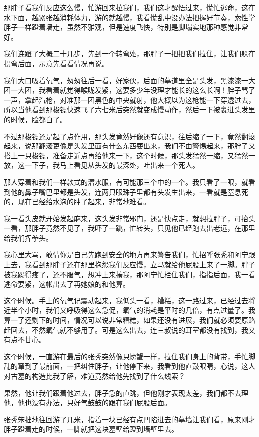 那胖子看我们反应这么慢，忙游回来拉我们，我们这才醒悟过来，慌忙逃命，这在水下面，越紧张越消耗体力，游的就越慢，我看慌乱中没办法把握好节奏，索性学胖子一样蹬着墙走，虽然不雅观，但是速度飞快，特别是脚塌实地那种感觉非常好。

我们连蹬了大概二十几步，先到一个转弯处，那胖子一把把我们拉住，让我们躲在拐弯后面，示意先看看情况再说。

我们大口吸着氧气，匆匆往后一看，好家伙，后面的墓道里全是头发，黑漆漆一大团一大团，我看着就觉得喉咙发紧，这要多少年没理才能长的这么长啊！胖子骂了一声，拿起汽枪，对准那一团黑色的中央就射，他大概以为这枪能一下穿透过去，所以当他看到那梭镖快速飞了六七米后突然就变成慢动作，然后一下被裹进头发里的时候，脸都白了。

不过那梭镖还是起了点作用，那头发竟然好像还有意识，往后缩了一下，竟然翻滚起来，说那翻滚更像是头发里面有什么东西要出来，我们不由警惕起来，那胖子又搭上一只梭镖，准备走近点再给他来一下，这个时候，那头发猛然一缩，又猛然一放，这一下子，我马上看见从头发的最深处，吐出来一个死人。

那人穿着和我们一样款式的潜水服，有可能那三个中的一个。我只看了一眼，就看到他的鼻子嘴巴里都是头发，连两只眼珠子里都有头发生出来，一看就是窒息死的，现在已经给水泡的肿了起来，非常地难看。

我一看头皮就开始发起麻来，这头发非常邪门，还是快点走，就想拉胖子，可抬头一看，那胖子竟然不见了，我吓了一跳，忙转头，只见他已经跑去出老远，在那里给我们挥拳头。

我心里大骂，敢情你是自己先跑到安全的地方再来警告我们，忙招呼张秃和阿宁跟上去，我看到那胖子还在那里抱怨我们反应慢，立马就给他屁股上来了一脚。胖子被我踢得疼了，还不服气，想冲上来揍我，那阿宁忙栏住我们，指指后面，我一看逃命要紧，这帐出去了再她娘的和他算。

这个时候。手上的氧气记震动起来，我低头一看，糟糕，这一路过来，已经过去将近半个小时，我们又呼吸得这么急促，氧气的消耗是平时的几倍，有点过量了。我算一了还剩下的时间，情况可以说非常糟糕，如果还没有进展，我们就必须要原路赶回去，不然氧气就不够用了。可是这么出去，连三叔说的耳室都没有找到，我又有点不甘心。

这个时候，一直游在最后的张秃突然像只螃蟹一样，拉住我们身上的背带，手忙脚乱的窜到了最前面，一把纠住胖子，让他停下来，我看到他直鼓眼睛，心说，这人对古墓的构造比我了解，难道竟然给他先找到了什么线索？

果然，他让我们跟着他过去，胖子急的直跳，但他刚才表现太差，我们都不去理他，他也没有办法，只好气鼓鼓的跟在我们屁股后面。

张秃笨拙地往回游了几米，指着一块已经有点凹陷进去的墓墙让我们看，原来刚才胖子蹬着走的时候，一脚就把这块墓壁给蹬到墙壁里去。

